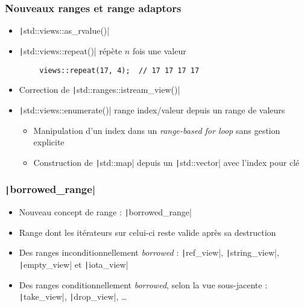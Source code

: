 \documentclass[C++.tex]{subfiles}
\begin{document}
\begin{frame}[fragile]
	\frametitle{Nouveaux ranges et range adaptors}
	\begin{itemize}
		\item \texttt|std::views::as_rvalue()|
		\item \texttt|std::views::repeat()| répète $n$ fois une valeur
	\end{itemize}

	\begin{verbatim}
		views::repeat(17, 4);  // 17 17 17 17
	\end{verbatim}

	\begin{itemize}
		\item Correction de \texttt|std::ranges::istream_view()|
		\item \texttt|std::views::enumerate()| range index/valeur depuis un range de valeurs
		\begin{itemize}
			\item Manipulation d'un index dans un \textit{range-based for loop} sans gestion explicite
			\item Construction de \texttt|std::map| depuis un \texttt|std::vector| avec l'index pour clé
		\end{itemize}
	\end{itemize}

\end{frame}

\begin{frame}[fragile]
	\frametitle{\texttt|borrowed_range|}
	\begin{itemize}
		\item Nouveau concept de range : \texttt|borrowed_range|
		\item Range dont les itérateurs sur celui-ci reste valide après sa destruction
		\item Des ranges inconditionnellement \textit{borrowed} : \texttt|ref_view|, \texttt|string_view|, \texttt|empty_view| et \texttt|iota_view|
		\item Des ranges conditionnellement \textit{borrowed}, selon la vue sous-jacente : \texttt|take_view|, \texttt|drop_view|, \ldots{}
	\end{itemize}

\end{frame}
\end{document}
